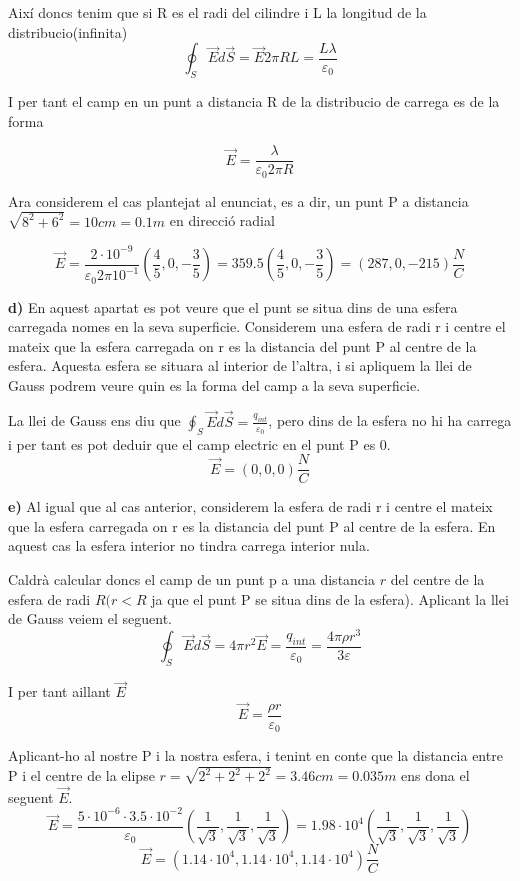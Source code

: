 \documentclass[12pt, a4papre]{article}
\begin{document}
	Així doncs tenim que si R es el radi del cilindre i L la longitud de la distribucio(infinita)
	\[
	\oint_S\vec{E}d\vec{S} = \vec{E}2\pi RL = \frac{L\lambda}{\varepsilon_0}
	\]
	
	I per tant el camp en un punt a distancia R de la distribucio de carrega es de la forma
	
	\[
	\vec{E} = \frac{\lambda}{\varepsilon_0 2\pi R}
	\]
	
	Ara considerem el cas plantejat al enunciat, es a dir, un punt P a distancia $\sqrt{8^2+6^2} = 10cm = 0.1m$ en direcció radial
	
	\[
	\vec{E} = \frac{2\cdot 10^{-9}}{\varepsilon_0 2\pi 10^{-1}}(\frac{4}{5}, 0, -\frac{3}{5}) = 359.5(\frac{4}{5}, 0, -\frac{3}{5})=(287, 0, -215) \frac{N}{C}
	\]
	
	\textbf{d)} En aquest apartat es pot veure que el punt se situa dins de una esfera carregada nomes en la seva superficie. Considerem una esfera de radi r i centre el mateix que la esfera carregada on r es la distancia del punt P al centre de la esfera. Aquesta esfera se situara al interior de l'altra, i si apliquem la llei de Gauss podrem veure quin es la forma del camp a la seva superficie. 
	
	La llei de Gauss ens diu que $\oint_S\vec{E}d\vec{S} = \frac{q_{int}}{\varepsilon_0}$, pero dins de la esfera no hi ha carrega i per tant es pot deduir que el camp electric en el punt P es 0.
	\[
	\vec{E} = (0,0,0) \frac{N}{C}
	\]

	\newpage
	\textbf{e)} Al igual que al cas anterior, considerem la esfera de radi r i centre el mateix que la esfera carregada on r es la distancia del punt P al centre de la esfera. En aquest cas la esfera interior no tindra carrega interior nula. 
	
	Caldrà calcular doncs el camp de un punt p a una distancia $r$ del centre de la esfera de radi $R(r < R$ ja que el punt P se situa dins de la esfera). Aplicant la llei de Gauss veiem el seguent.
	\[
	\oint_S\vec{E}d\vec{S} = 4\pi r^2 \vec{E}= \frac{q_{int}}{\varepsilon_0} = \frac{4 \pi \rho r^3}{3 \varepsilon }
	\]
	
	I per tant aillant $\vec{E}$
	\[
	\vec{E} = \frac{\rho r}{\varepsilon_0}
	\]
	
	Aplicant-ho al nostre P i la nostra esfera, i tenint en conte que la distancia entre P i el centre de la elipse $r=\sqrt{2^2+2^2+2^2} = 3.46cm = 0.035m$ ens dona el seguent $\vec{E}$.
	\[
	\vec{E} = \frac{5\cdot 10^{-6}\cdot 3.5\cdot 10^{-2}}{\varepsilon_0} (\frac{1}{\sqrt{3}}, \frac{1}{\sqrt{3}}, \frac{1}{\sqrt{3}})= 1.98\cdot 10^4 (\frac{1}{\sqrt{3}}, \frac{1}{\sqrt{3}}, \frac{1}{\sqrt{3}})
	\]
	\[
	\vec{E} = (1.14\cdot 10^4, 1.14\cdot 10^4, 1.14\cdot 10^4) \frac{N}{C}
	\]
	
\end{document}
